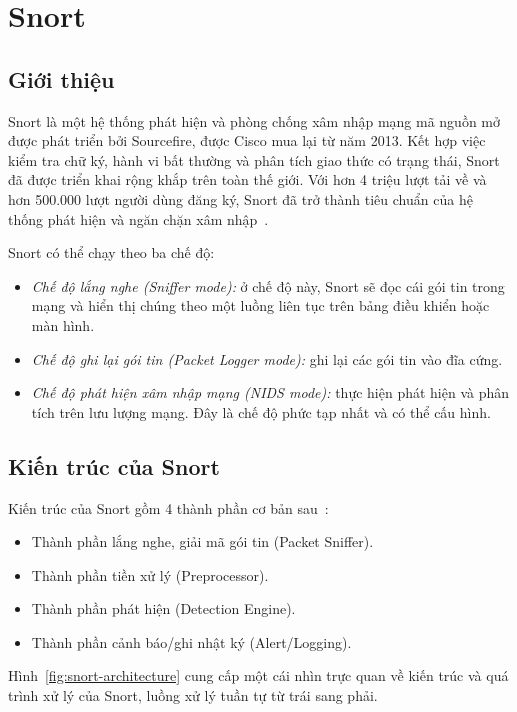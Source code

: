 \restoregeometry%


\section{Snort}
\subsection{Giới thiệu}
Snort là một hệ thống phát hiện và phòng chống xâm nhập mạng mã nguồn mở được phát triển bởi Sourcefire, được Cisco mua lại từ năm 2013. Kết hợp việc kiểm tra chữ ký, hành vi bất thường và phân tích giao thức có trạng thái, Snort đã được triển khai rộng khắp trên toàn thế giới. Với hơn 4 triệu lượt tải về và hơn 500.000 lượt người dùng đăng ký, Snort đã trở thành tiêu chuẩn của hệ thống phát hiện và ngăn chặn xâm nhập~\cite{snort2017documents}.

Snort có thể chạy theo ba chế độ:
\begin{itemize}
\item \emph{Chế độ lắng nghe (Sniffer mode):} ở chế độ này, Snort sẽ đọc cái gói tin trong mạng và hiển thị chúng theo một luồng liên tục trên bảng điều khiển hoặc màn hình.
\item \emph{Chế độ ghi lại gói tin (Packet Logger mode):} ghi lại các gói tin vào đĩa cứng.
\item \emph{Chế độ phát hiện xâm nhập mạng (NIDS mode):} thực hiện phát hiện và phân tích trên lưu lượng mạng. Đây là chế độ phức tạp nhất và có thể cấu hình.
\end{itemize}

\subsection{Kiến trúc của Snort}
Kiến trúc của Snort gồm 4 thành phần cơ bản sau~\cite{caswell2007snort}:

\begin{itemize}
\item Thành phần lắng nghe, giải mã gói tin (Packet Sniffer).
\item Thành phần tiền xử lý (Preprocessor).
\item Thành phần phát hiện (Detection Engine).
\item Thành phần cảnh báo/ghi nhật ký (Alert/Logging).\\
\end{itemize}

Hình~\ref{fig:snort-architecture} cung cấp một cái nhìn trực quan về kiến trúc và quá trình xử lý của Snort, luồng xử lý tuần tự từ trái sang phải.

